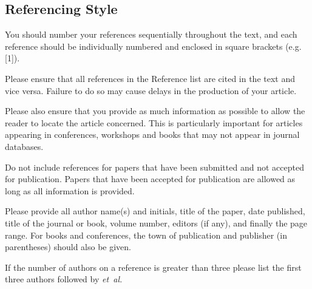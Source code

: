 \documentclass{IET}
\begin{document}
\subsection{Referencing Style}

You should number your references sequentially throughout the text, and each
reference should be individually numbered and enclosed in square brackets
(e.g. [1]).

Please ensure that all references in the Reference list are cited in the
text and vice versa. Failure to do so may cause delays in the production of
your article.

Please also ensure that you provide as much information as possible to allow
the reader to locate the article concerned. This is particularly important
for articles appearing in conferences, workshops and books that may not
appear in journal databases.

Do not include references for papers that have been submitted and not
accepted for publication. Papers that have been accepted for publication are
allowed as long as all information is provided.

Please provide all author name(s) and initials, title of the paper, date
published, title of the journal or book, volume number, editors (if any),
and finally the page range. For books and conferences, the town of
publication and publisher (in parentheses) should also be given.

If the number of authors on a reference is greater than three please list
the first three authors followed by \textit{et~al.}
\end{document}
